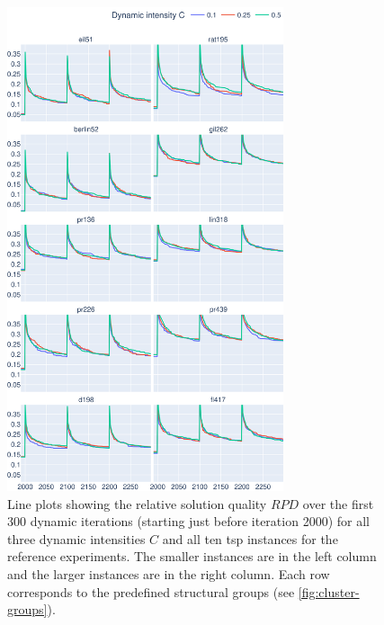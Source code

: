 \begin{figure}[h!]
	\centering
	\includegraphics[width=0.725\textwidth]{results/part3/run_plot_cmp_dynamic_aggr_problem_y_best_solution_1_to_30_Reference.svg}
	\caption[Line plots showing the relative solution quality $RPD$ over dynamic iterations for all dynamic intensities $C$ and all \gls{tsp} instances for the \gls{hpo} experiments.]{Line plots showing the relative solution quality $RPD$ over the first 300 dynamic iterations (starting just before iteration 2000) for all three dynamic intensities $C$ and all ten \gls{tsp} instances for the reference experiments. The smaller instances are in the left column and the larger instances are in the right column. Each row corresponds to the predefined structural groups (see \cref{fig:cluster-groups}).}
	\label{fig:run_plot_cmp_dynamic_aggr_problem_ref}
\end{figure}


